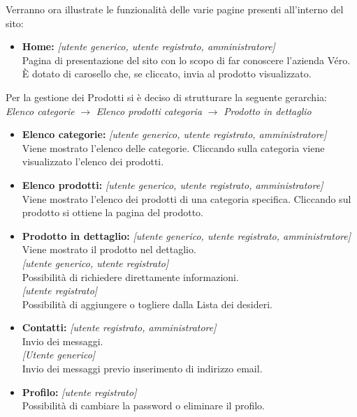 \documentclass[a4paper, 11pt]{article}
\begin{document}
Verranno ora illustrate le funzionalità delle varie pagine presenti all'interno del sito:
\begin{itemize}
	\item \textbf{Home:} \textit{[utente generico, utente registrato, amministratore]} \\
	Pagina di presentazione del sito con lo scopo di far conoscere l'azienda Véro. \\
	È dotato di carosello che, se cliccato, invia al prodotto visualizzato.
\end{itemize}
Per la gestione dei Prodotti si è deciso di strutturare la seguente gerarchia: \\
\textit{Elenco categorie} $\rightarrow$ \textit{Elenco prodotti categoria} $\rightarrow$  \textit{Prodotto in dettaglio}
\begin{itemize}
	\item \textbf{Elenco categorie:}  \textit{[utente generico, utente registrato, amministratore]} \\
	Viene mostrato l’elenco delle categorie. Cliccando sulla categoria viene visualizzato l’elenco dei prodotti.

 	\item \textbf{Elenco prodotti:} \textit{[utente generico, utente registrato, amministratore]} \\
 	Viene mostrato l’elenco dei prodotti di una categoria specifica. Cliccando sul prodotto si ottiene la pagina del prodotto.
 	
 	\item \textbf{Prodotto in dettaglio:} \textit{[utente generico, utente registrato, amministratore]} \\
 	Viene mostrato il prodotto nel dettaglio. \\
 	\textit{[utente generico, utente registrato]} \\
 	Possibilità di richiedere direttamente informazioni. \\
	\textit{[utente registrato]} \\
	Possibilità di aggiungere o togliere dalla Lista dei desideri.
	
	\item \textbf{Contatti:} \textit{[utente registrato, amministratore]} \\
	Invio dei messaggi. \\
	\textit{[Utente generico]} \\
	Invio dei messaggi previo inserimento di indirizzo email.
	
	\item \textbf{Profilo:}	\textit{[utente registrato]} \\
	Possibilità di cambiare la password o eliminare il profilo.
	

\end{itemize}
\end{document}

